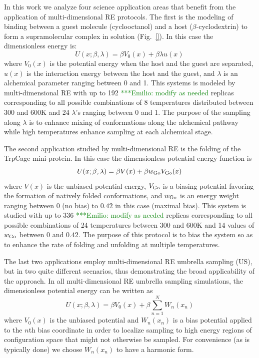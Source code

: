 \documentclass{sig-alternate}
\newcommand{\egnote}[1]{ {\textcolor{green} { ***Emilio: #1 }}}
\begin{document}
In this work we analyze four science application areas that benefit from the application of multi-dimensional RE protocols. The first is the modeling of binding between a guest molecule (cyclooctanol) and a host ($\beta$-cyclodextrin) to form a supramolecular complex in solution (Fig.\ \ref{}). In this case the dimensionless energy is:
\begin{equation}
U(x;\beta,\lambda) = \beta V_0(x) + \beta \lambda u(x) \,
\end{equation}
where $V_0(x)$ is the potential energy when the host and the guest are separated, $u(x)$ is the interaction energy between the host and the guest, and $\lambda$ is an alchemical parameter ranging between 0 and 1. This systems is modeled by multi-dimensional RE with up to 192 \egnote{modify as needed} replicas corresponding to all possible combinations of 8 temperatures distributed between 300 and 600K and 24 $\lambda$'s ranging between 0 and 1. The purpose of the sampling along $\lambda$ is to enhance mixing of conformations along the alchemical pathway while high temperatures enhance sampling at each alchemical stage.

The second application studied by multi-dimensional RE is the folding of the TrpCage mini-protein. In this case the dimensionless potential energy function is
\begin{equation}
U(x;\beta,\lambda) = \beta V(x) + \beta w_{\rm Go} V_{\rm Go}(x) \,
\end{equation}
where $V(x)$ is the unbiased potential energy, $V_{\rm Go}$ is a biasing potential favoring the formation of natively folded conformations, and $w_{\rm Go}$ is an energy weight ranging between 0 (no bias) to $0.42$ in this case (maximal bias). This system is studied with up to 336 \egnote{modify as needed} replicas corresponding to all possible combinations of 24 temperatures between 300 and 600K and 14 values of  $w_{\rm Go}$ between 0 and $0.42$. The purpose of this protocol is to bias the system so as to enhance the rate of folding and unfolding at multiple temperatures.

The last two applications employ multi-dimensional RE umbrella sampling (US), but in two
quite different scenarios, thus demonstrating the broad applicability of the approach.
In all multi-dimensional RE umbrella sampling simulations, the dimensionless potential
energy can be written as
\begin{equation}
U(x;\beta,\lambda) = \beta V_0(x) + \beta \sum_{n=1}^N W_n(x_n)
\end{equation}
where $V_0(x)$ is the unbiased potential and $W_n(x_n)$ is a bias potential applied to
the $n$th bias coordinate in order to localize sampling to high energy regions of
configuration space that might not otherwise be sampled. For convenience (as is
typically done) we choose $W_n(x_n)$ to have a harmonic form.  
\end{document}
